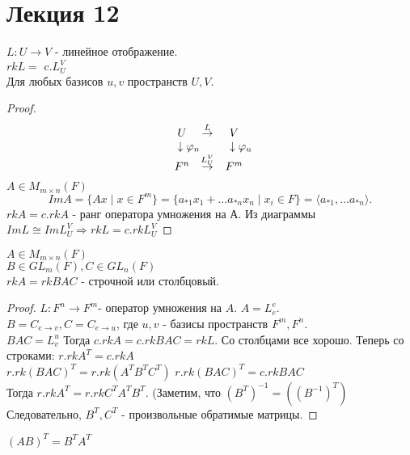\documentclass[12pt]{report}
\begin{document}
\section{Лекция 12}
\begin{lm}
    $L: U \to V$ - линейное отображение.\\
    $rk L = \mbox{ c.} L_U ^V$ \\
    Для любых базисов $u, v$ пространств $U, V$.
\end{lm}
\begin{proof}
    \[
	\begin{array}{ccc}
	    U & \stackrel{L}\to & V \\
	    \downarrow \lefteqn {\varphi_n} && \downarrow \lefteqn{\varphi_v} \\
	    F^n & \stackrel{L_U ^V} \to & F^m
    \end{array}
    .\] 
    $A \in M_{m \times n} (F)$
    \[
	Im A = \{A x \mid x \in  F^m\} = \{a_{*1} x_1 + \ldots a_{*n}x_n \mid x_i \in  F\} = \langle a_{*1} , \ldots a_{*n} \rangle
    .\] 
    $rk A = c. rk A$ - ранг оператора умножения на А.
    Из диаграммы $Im L \cong Im L_U ^V \Rightarrow rk L = c.rk L_U ^V $
\end{proof}
\begin{lm}
    $A \in M_{m \times n} (F)$\\
    $B \in GL_m(F), C \in GL_n (F)$ \\
    $rk A = rk B A C$ - строчной или столбцовый.
\end{lm}
\begin{proof}
    $L : F^n \to F^m $- оператор умножения на $A$. $A = L_e ^e$.\\
    $B = C_{e \to v}, C = C_{e \to u}$, где $u, v$ - базисы пространств $F^m , F^n$.\\
    $BAC = L_v ^ u$
    Тогда  $c. rk A = c.rk BAC = rk L$.
    Со столбцами все хорошо.
    Теперь со строками:
    $r. rk A^T = c. rk A$ \\
    $r. rk (BAC)^T = r. rk (A^T B^T C^T)$
    $r. rk (BAC)^T = c. rk BAC$ \\
    Тогда $r. rk A^T = r. rk C^T A^T B^T$. (Заметим, что   $(B^T)^{-1} = ((B^{-1})^T)$
    Следовательно, $B^T, C^T$ - произвольные обратимые матрицы.
\end{proof}
\begin{probl}
    $(AB)^T = B^T A^T$
\end{probl}
\end{document}
